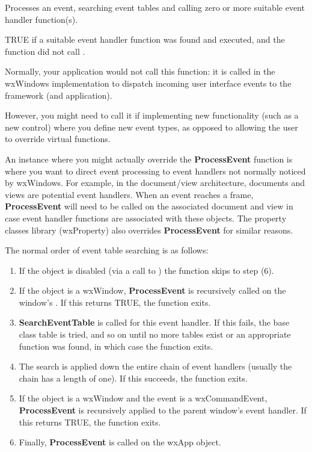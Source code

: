 Processes an event, searching event tables and calling zero or more suitable event handler function(s).




TRUE if a suitable event handler function was found and executed, and the function did not
call .


Normally, your application would not call this function: it is called in the wxWindows
implementation to dispatch incoming user interface events to the framework (and application).

However, you might need to call it if implementing new functionality (such as a new control) where
you define new event types, as opposed to allowing the user to override virtual functions.

An instance where you might actually override the {\bf ProcessEvent} function is where you want
to direct event processing to event handlers not normally noticed by wxWindows. For example,
in the document/view architecture, documents and views are potential event handlers.
When an event reaches a frame, {\bf ProcessEvent} will need to be called on the associated
document and view in case event handler functions are associated with these objects.
The property classes library (wxProperty) also overrides {\bf ProcessEvent} for similar reasons.

The normal order of event table searching is as follows:

\begin{enumerate}\itemsep=0pt
\item If the object is disabled (via a call to )
the function skips to step (6).
\item If the object is a wxWindow, {\bf ProcessEvent} is recursively called on the window's\rtfsp
{}. If this returns TRUE, the function exits.
\item {\bf SearchEventTable} is called for this event handler. If this fails, the base
class table is tried, and so on until no more tables exist or an appropriate function was found,
in which case the function exits.
\item The search is applied down the entire chain of event handlers (usually the chain has a length
of one). If this succeeds, the function exits.
\item If the object is a wxWindow and the event is a wxCommandEvent, {\bf ProcessEvent} is
recursively applied to the parent window's event handler. If this returns TRUE, the function exits.
\item Finally, {\bf ProcessEvent} is called on the wxApp object.
\end{enumerate}

